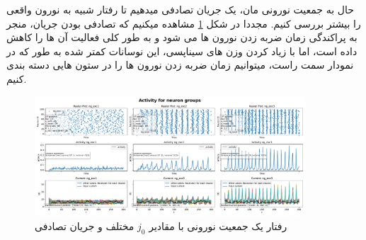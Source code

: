                 حال به جمعیت نورونی مان، یک جریان تصادفی میدهیم تا رفتار شبیه به نورون واقعی را بیشتر بررسی کنیم. مجددا در شکل
                \ref{fig:part2-one-ng-full-synapse-diff-j-rand-curr}
                مشاهده میکنیم که تصادفی بودن جریان، منجر به پراکندگی زمان ضربه زدن نورون ها می شود و به طور کلی فعالیت آن ها را کاهش داده است، اما با زیاد کردن وزن های سیناپسی، این نوسانات کمتر شده به طور که در نمودار سمت راست، میتوانیم زمان ضربه زدن نورون ها را در ستون هایی دسته بندی کنیم.
                \begin{figure}[!ht]
                    \centering
                    \includegraphics[width=0.9\textwidth]{plots/part2-one-ng-full-synapse-diff-j-rand-curr.pdf} 
                    \caption{رفتار یک جمعیت نورونی با مقادیر $j_0$ مختلف و جریان تصادفی}
                    \label{fig:part2-one-ng-full-synapse-diff-j-rand-curr}
                \end{figure}

